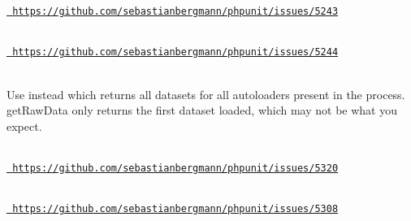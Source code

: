 \begin{DoxyRefList}
\label{deprecated__deprecated000026}%
%
\href{https://github.com/sebastianbergmann/phpunit/issues/5243}{\texttt{ https\+://github.\+com/sebastianbergmann/phpunit/issues/5243}}  
\item[Global \doxylink{class_p_h_p_unit_1_1_framework_1_1_mock_object_1_1_generator_1_1_generator_a4935a7fec18075a6c726e82e36d82c50}{Generator\+::object\+For\+Trait} (string \$trait\+Name, string \$trait\+Class\+Name=\textquotesingle{}\textquotesingle{}, bool \$call\+Autoload=true, bool \$call\+Original\+Constructor=false, array \$arguments=\mbox{[}\mbox{]})]\hfill \\
\label{deprecated__deprecated000027}%
%
\href{https://github.com/sebastianbergmann/phpunit/issues/5244}{\texttt{ https\+://github.\+com/sebastianbergmann/phpunit/issues/5244}}  
\item[Global \doxylink{class_composer_1_1_installed_versions_a6ecee8643c03c515b55686f03d117665}{Installed\+Versions\+::get\+Raw\+Data} ()]\hfill \\
\label{deprecated__deprecated000001}%
%
Use  instead which returns all datasets for all autoloaders present in the process. get\+Raw\+Data only returns the first dataset loaded, which may not be what you expect.  
\item[Global \doxylink{class_p_h_p_unit_1_1_framework_1_1_mock_object_1_1_mock_builder_a31b4c2808daa08bcea0f4ce60f75537d}{Mock\+Builder\+::add\+Methods} (array \$methods)]\hfill \\
\label{deprecated__deprecated000031}%
%
\href{https://github.com/sebastianbergmann/phpunit/issues/5320}{\texttt{ https\+://github.\+com/sebastianbergmann/phpunit/issues/5320}}  
\item[Global \doxylink{class_p_h_p_unit_1_1_framework_1_1_mock_object_1_1_mock_builder_ac903aa0556b5db1166294c7007ee19bc}{Mock\+Builder\+::allow\+Mocking\+Unknown\+Types} ()]\hfill \\
\label{deprecated__deprecated000039}%
%
\href{https://github.com/sebastianbergmann/phpunit/issues/5308}{\texttt{ https\+://github.\+com/sebastianbergmann/phpunit/issues/5308}}  
\item[Global \doxylink{class_p_h_p_unit_1_1_framework_1_1_mock_object_1_1_mock_builder_ad0d2332a31f15a18157ec118935ff6f7}{Mock\+Builder\+::disable\+Argument\+Cloning} ()]\hfill \\

\end{DoxyRefList}
